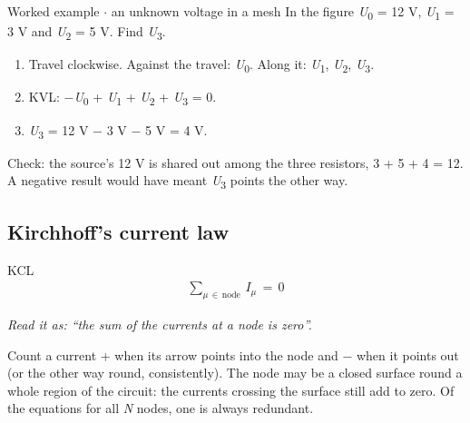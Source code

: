\documentclass[11pt]{article}
\begin{document}
\begin{keepsection}
\begin{keepsection}
\begin{center}
\begin{minipage}[t]{0.950\linewidth}
\begin{tikzpicture}[line join=round]
\end{tikzpicture}\par{}\end{minipage}
\end{center}

\begin{workedbox}{Worked example \ensuremath{\cdot} an unknown voltage in a mesh}
In the figure \textit{U}\textsubscript{0} = 12 V, \textit{U}\textsubscript{1} = 3 V and \textit{U}\textsubscript{2} = 5 V. Find \textit{U}\textsubscript{3}.

\begin{enumerate}
\item Travel clockwise. Against the travel: \textit{U}\textsubscript{0}. Along it: \textit{U}\textsubscript{1}, \textit{U}\textsubscript{2}, \textit{U}\textsubscript{3}.
\item KVL: \ensuremath{-}\textit{U}\textsubscript{0} + \textit{U}\textsubscript{1} + \textit{U}\textsubscript{2} + \textit{U}\textsubscript{3} = 0.
\item \textit{U}\textsubscript{3} = 12 V \ensuremath{-} 3 V \ensuremath{-} 5 V = 4 V.
\end{enumerate}

Check: the source’s 12 V is shared out among the three resistors, 3 + 5 + 4 = 12. A negative result would have meant \textit{U}\textsubscript{3} points the other way.
\end{workedbox}
\end{keepsection}

\begin{keepsection}
\subsection{Kirchhoff’s current law}

\begin{equationcard}{KCL}
\[ \begin{gathered} \sum_{μ\, \in \, \text{node}}^{} \, {I}_{μ}\, =\, 0 \end{gathered} \]
{\small \emph{Read it as: “the sum of the currents at a node is zero”.}\par Count a current + when its arrow points into the node and \ensuremath{-} when it points out (or the other way round, consistently). The node may be a closed surface round a whole region of the circuit: the currents crossing the surface still add to zero. Of the equations for all \textit{N} nodes, one is always redundant.}
\end{equationcard}
\end{keepsection}


\end{keepsection}
\end{document}

